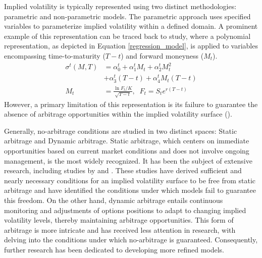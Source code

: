 Implied volatility is typically represented using two distinct methodologies: parametric and non-parametric models. The parametric approach uses specified variables to parameterize implied volatility within a defined domain. A prominent example of this representation can be traced back to \cite{dumas1998implied} study, where a polynomial representation, as depicted in Equation \eqref{regression_model}, is applied to variables encompassing time-to-maturity ($T-t$) and forward moneyness ($M_t$).
\begin{align}
    \sigma^t(M, T) &= \alpha^t_0 + \alpha^t_1M_t + \alpha^t_2M^2_t \nonumber\\
    &+ \alpha^t_3(T-t) + \alpha^t_4M_t(T-t)\label{regression_model}\\
    M_t &= \frac{\ln{F_t} / K}{\sqrt{T-t}}, \; \; \nonumber 
    F_t = S_te^{r(T-t)} \nonumber 
\end{align}
However, a primary limitation of this representation is its failure to guarantee the absence of arbitrage opportunities within the implied volatility surface (\cite{homescu2011implied}). 

Generally, no-arbitrage conditions are studied in two distinct spaces: Static arbitrage and Dynamic arbitrage. Static arbitrage, which centers on immediate opportunities based on current market conditions and does not involve ongoing management, is the most widely recognized. It has been the subject of extensive research, including studies by \cite{roper2010arbitrage} and \cite{niu2015no}. These studies have derived sufficient and nearly necessary conditions for an implied volatility surface to be free from static arbitrage and have identified the conditions under which models fail to guarantee this freedom. On the other hand, dynamic arbitrage entails continuous monitoring and adjustments of options positions to adapt to changing implied volatility levels, thereby maintaining arbitrage opportunities. This form of arbitrage is more intricate and has received less attention in research, with \cite{niu2015no} delving into the conditions under which no-arbitrage is guaranteed. Consequently, further research has been dedicated to developing more refined models.

